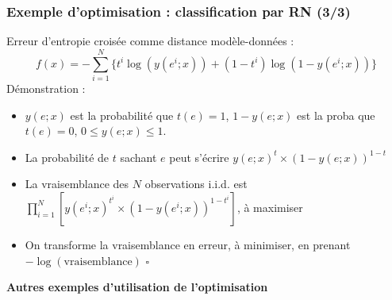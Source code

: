 \documentclass[12pt]{beamer}
\begin{document}
\begin{frame}
\begin{itemize}
\begin{frame}
\frametitle{Exemple d'optimisation : classification par RN (3/3)}
\alert{Erreur d'entropie croisée} comme distance modèle-données : 
\begin{equation*}
f(x) = - \sum_{i=1}^N \{ t^i \log(y(e^i;x)) + (1-t^i) \log(1 - y(e^i;x))\}
\end{equation*}
Démonstration :\\
\begin{itemize}
\item $y(e;x)$ est la probabilité que $t(e)=1$, $1-y(e;x)$ est la proba que $t(e)=0$, $0 \le y(e;x) \le 1$.
\item La probabilité de $t$ sachant $e$ peut s'écrire $y(e;x)^t \times (1 - y(e;x))^{1-t}$
\item La vraisemblance des $N$ observations i.i.d. est $\prod_{i=1}^N \left[y(e^i;x)^{t^i} \times (1-y(e^i;x))^{1-t^i}\right]$, à maximiser
\item On transforme la vraisemblance en erreur, à minimiser, en prenant $-\log(\text{vraisemblance})$ \qquad $\square$
\end{itemize}
\end{frame}

\begin{frame}
\begin{center}
{ 
\textbf{
Autres exemples d'utilisation de l'optimisation
} %
}%
\end{center}
\end{frame}



\end{itemize}
\end{frame}
\end{document}
